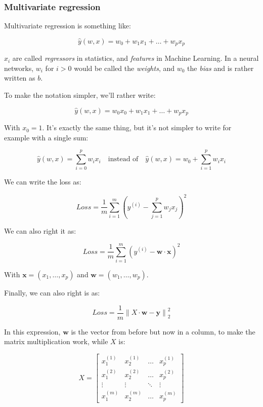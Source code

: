 \documentclass{article}
\theoremstyle{problemstyle}
\begin{document}
\subsubsection{Multivariate regression}

Multivariate regression is something like:

\[
  \hat{y} (w,x) = w_0 + w_1x_1 + \dots + w_p x_p
\]

$x_i$ are called \emph{regressors} in statistics, and \emph{features} in Machine Learning. In a neural networks, $w_i$ for $i > 0$ would be called the \emph{weights}, and $w_0$ the \emph{bias} and is rather written as $b$.

To make the notation simpler, we'll rather write:

\[
  \hat{y} (w,x) = w_0x_0 + w_1x_1 + \dots + w_p x_p
\]

With $x_0 =1$. It's exactly the same thing, but it's not simpler to write for example with a single sum:

\[
  \hat{y} (w,x) = \sum\limits_{i=0}^{p} w_i x_i \quad \text{instead of}  \quad \hat{y} (w,x) = w_0 +  \sum\limits_{i=1}^{p} w_i x_i
\]

We can write the loss as:

\[
  Loss = \frac{1}{m} \sum\limits_{i=1}^{m} \left( y^{(i)} - \sum\limits_{j=1}^{p} w_j x_j \right) ^{2}
\]

We can also right it as:

\[
  Loss = \frac{1}{m} \sum\limits_{i=1}^{m} \left( y^{(i)} - \textbf{w}\cdot \textbf{x} \right) ^{2}
\]

With $\textbf{x} = (x_1, \dots , x_p)$ and $\textbf{w} = (w_1, \dots , w_p)$.

Finally, we can also right is as:

\[
  Loss = \frac{1}{m} \left\lVert X \cdot \textbf{w} - \textbf{y} \right\rVert_2 ^{2}
\]

In this expression, $\textbf{w}$ is the vector from before but now in a column, to make the matrix multiplication work, while $X$ is:

\[
  X =
  \begin{bmatrix}
    x_1^{(1)} & x_2^{(1)} & \dots & x_p^{(1)} \\
    x_1^{(2)} & x_2^{(2)} & \dots & x_p^{(2)} \\
    \vdots    & \vdots    & \ddots& \vdots    \\
    x_1^{(m)} & x_2^{(m)} & \dots & x_p^{(m)}
  \end{bmatrix}
\]
\end{document}

